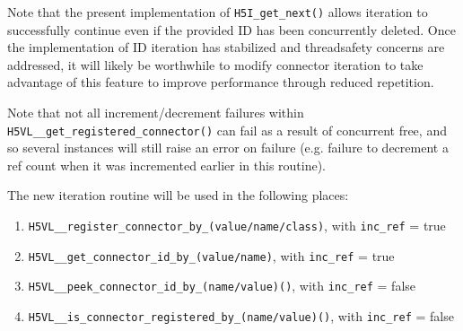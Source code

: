 \documentclass{article}
\begin{document}
Note that the present implementation of \texttt{H5I\_get\_next()} allows iteration to successfully continue even if the provided ID has been concurrently deleted. Once the implementation of ID iteration has stabilized and threadsafety concerns are addressed, it will likely be worthwhile to modify connector iteration to take advantage of this feature to improve performance through reduced repetition.


Note that not all increment/decrement failures within  \texttt{H5VL\_\_get\_registered\_connector()}  can fail as a result of concurrent free, and so several instances will still raise an error on failure (e.g. failure to decrement a ref count when it was incremented earlier in this routine).

The new iteration routine will be used in the following places:

\begin{enumerate}
    \item \texttt{H5VL\_\_register\_connector\_by\_(value/name/class)}, with \texttt{inc\_ref} = true

    \item \texttt{H5VL\_\_get\_connector\_id\_by\_(value/name)}, with \texttt{inc\_ref} = true
    
    \item \texttt{H5VL\_\_peek\_connector\_id\_by\_(name/value)()}, with \texttt{inc\_ref} = false

    \item \texttt{H5VL\_\_is\_connector\_registered\_by\_(name/value)()}, with \texttt{inc\_ref} = false  

\end{enumerate}


\appendix
\newpage


\newpage


\newpage


\newpage


\newpage







\end{document}
